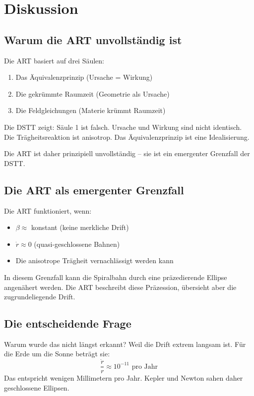 \documentclass[12pt,a4paper]{article}
\begin{document}
\section{Diskussion}

\subsection{Warum die ART unvollständig ist}

Die ART basiert auf drei Säulen:
\begin{enumerate}
\item Das Äquivalenzprinzip (Ursache = Wirkung)
\item Die gekrümmte Raumzeit (Geometrie als Ursache)
\item Die Feldgleichungen (Materie krümmt Raumzeit)
\end{enumerate}

Die DSTT zeigt: Säule 1 ist falsch. Ursache und Wirkung sind nicht identisch. Die Trägheitsreaktion ist anisotrop. Das Äquivalenzprinzip ist eine Idealisierung.

Die ART ist daher prinzipiell unvollständig -- sie ist ein emergenter Grenzfall der DSTT.

\subsection{Die ART als emergenter Grenzfall}

Die ART funktioniert, wenn:
\begin{itemize}
\item $\beta \approx$ konstant (keine merkliche Drift)
\item $\dot{r} \approx 0$ (quasi-geschlossene Bahnen)
\item Die anisotrope Trägheit vernachlässigt werden kann
\end{itemize}

In diesem Grenzfall kann die Spiralbahn durch eine präzedierende Ellipse angenähert werden. Die ART beschreibt diese Präzession, übersieht aber die zugrundeliegende Drift.

\subsection{Die entscheidende Frage}

Warum wurde das nicht längst erkannt? Weil die Drift extrem langsam ist. Für die Erde um die Sonne beträgt sie:
\begin{equation}
\frac{\dot{r}}{r} \approx 10^{-11} \text{ pro Jahr}
\end{equation}
Das entspricht wenigen Millimetern pro Jahr. Kepler und Newton sahen daher geschlossene Ellipsen.
\end{document}
